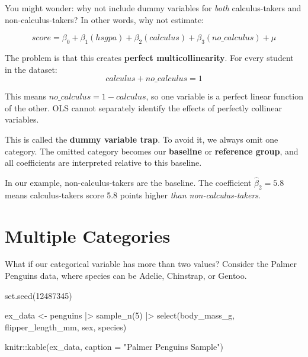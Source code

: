 \documentclass[
  letterpaper,
  DIV=11,
  numbers=noendperiod]{scrreprt}
\newenvironment{Shaded}{\begin{snugshade}}{\end{snugshade}}
\newcommand{\AttributeTok}[1]{\textcolor[rgb]{0.40,0.45,0.13}{#1}}
\newcommand{\DecValTok}[1]{\textcolor[rgb]{0.68,0.00,0.00}{#1}}
\newcommand{\FunctionTok}[1]{\textcolor[rgb]{0.28,0.35,0.67}{#1}}
\newcommand{\NormalTok}[1]{\textcolor[rgb]{0.00,0.23,0.31}{#1}}
\newcommand{\OtherTok}[1]{\textcolor[rgb]{0.00,0.23,0.31}{#1}}
\newcommand{\SpecialCharTok}[1]{\textcolor[rgb]{0.37,0.37,0.37}{#1}}
\newcommand{\StringTok}[1]{\textcolor[rgb]{0.13,0.47,0.30}{#1}}
\begin{document}
You might wonder: why not include dummy variables for \emph{both}
calculus-takers and non-calculus-takers? In other words, why not
estimate:

\[
score = \beta_0 + \beta_1(hsgpa) + \beta_2(calculus) + \beta_3(no\_calculus) + \mu
\]

The problem is that this creates \textbf{perfect multicollinearity}. For
every student in the dataset: \[
calculus + no\_calculus = 1
\]

This means \(no\_calculus = 1 - calculus\), so one variable is a perfect
linear function of the other. OLS cannot separately identify the effects
of perfectly collinear variables.

This is called the \textbf{dummy variable trap}. To avoid it, we always
omit one category. The omitted category becomes our \textbf{baseline} or
\textbf{reference group}, and all coefficients are interpreted relative
to this baseline.

In our example, non-calculus-takers are the baseline. The coefficient
\(\hat{\beta}_2 = 5.8\) means calculus-takers score 5.8 points higher
\emph{than non-calculus-takers}.

\section{Multiple Categories}\label{multiple-categories}

What if our categorical variable has more than two values? Consider the
Palmer Penguins data, where species can be Adelie, Chinstrap, or Gentoo.

\begin{Shaded}
\begin{Highlighting}[]
\FunctionTok{set.seed}\NormalTok{(}\DecValTok{12487345}\NormalTok{)}

\NormalTok{ex\_data }\OtherTok{\textless{}{-}}\NormalTok{ penguins }\SpecialCharTok{|\textgreater{}} 
    \FunctionTok{sample\_n}\NormalTok{(}\DecValTok{5}\NormalTok{) }\SpecialCharTok{|\textgreater{}} 
    \FunctionTok{select}\NormalTok{(body\_mass\_g, flipper\_length\_mm, sex, species)}

\NormalTok{knitr}\SpecialCharTok{::}\FunctionTok{kable}\NormalTok{(ex\_data, }\AttributeTok{caption =} \StringTok{"Palmer Penguins Sample"}\NormalTok{)}
\end{Highlighting}
\end{Shaded}
\end{document}
